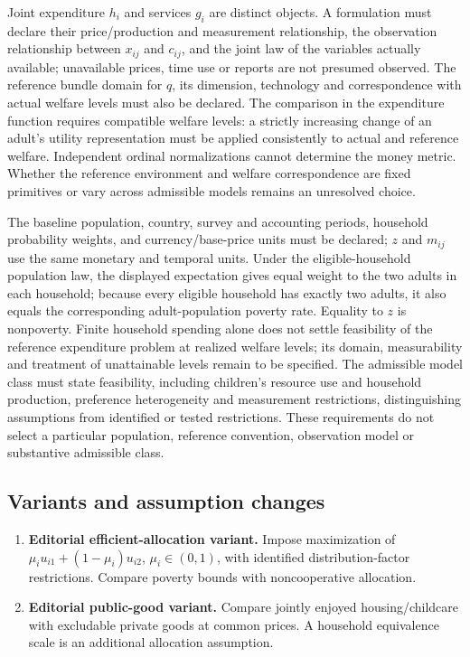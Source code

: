 \documentclass[11pt,a4paper]{article}
\begin{document}
Joint expenditure \(h_i\) and services \(g_i\) are distinct objects. A formulation must declare their price/production and measurement relationship, the observation relationship between \(x_{ij}\) and \(c_{ij}\), and the joint law of the variables actually available; unavailable prices, time use or reports are not presumed observed. The reference bundle domain for \(q\), its dimension, technology and correspondence with actual welfare levels must also be declared. The comparison in the expenditure function requires compatible welfare levels: a strictly increasing change of an adult's utility representation must be applied consistently to actual and reference welfare. Independent ordinal normalizations cannot determine the money metric. Whether the reference environment and welfare correspondence are fixed primitives or vary across admissible models remains an unresolved choice.

The baseline population, country, survey and accounting periods, household probability weights, and currency/base-price units must be declared; \(z\) and \(m_{ij}\) use the same monetary and temporal units. Under the eligible-household population law, the displayed expectation gives equal weight to the two adults in each household; because every eligible household has exactly two adults, it also equals the corresponding adult-population poverty rate. Equality to \(z\) is nonpoverty. Finite household spending alone does not settle feasibility of the reference expenditure problem at realized welfare levels; its domain, measurability and treatment of unattainable levels remain to be specified. The admissible model class must state feasibility, including children's resource use and household production, preference heterogeneity and measurement restrictions, distinguishing assumptions from identified or tested restrictions. These requirements do not select a particular population, reference convention, observation model or substantive admissible class.
\subsection*{Variants and assumption changes}
\begin{enumerate}
\item \textbf{Editorial efficient-allocation variant.} Impose maximization of \(\mu_i u_{i1}+(1-\mu_i)u_{i2}\), \(\mu_i\in(0,1)\), with identified distribution-factor restrictions. Compare poverty bounds with noncooperative allocation.
\item \textbf{Editorial public-good variant.} Compare jointly enjoyed housing/childcare with excludable private goods at common prices. A household equivalence scale is an additional allocation assumption.
\end{enumerate}
\end{document}
